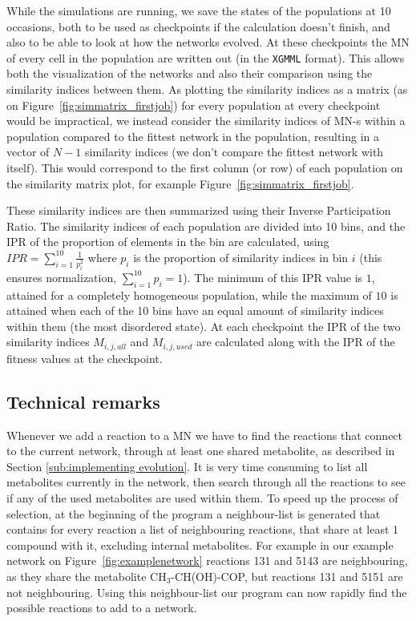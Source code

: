 \documentclass[a4paper,12pt]{article}
\begin{document}
While the simulations are running, we save the states of the populations at 10 occasions, both to be used as checkpoints if the calculation doesn't finish, and also to be able to look at how the networks evolved. At these checkpoints the MN of every cell in the population are written out (in the \texttt{XGMML} format). This allows both the visualization of the networks and also their comparison using the similarity indices between them. As plotting the similarity indices as a matrix (as on Figure~\ref{fig:simmatrix_firstjob}) for every population at every checkpoint would be impractical, we instead consider the similarity indices of MN-s within a population compared to the fittest network in the population, resulting in a vector of $N-1$ similarity indices (we don't compare the fittest network with itself). This would correspond to the first column (or row) of each population on the similarity matrix plot, for example Figure~\ref{fig:simmatrix_firstjob}.

These similarity indices are then summarized using their Inverse Participation Ratio. The similarity indices of each population are divided into 10 bins, and the IPR of the proportion of elements in the bin are calculated, using $IPR= \sum^{10}_{i=1} \frac{1}{p_i^2} $ where $p_i$ is the proportion of similarity indices in bin $i$ (this ensures normalization, $ \sum^{10}_{i=1} p_i=1$). The minimum of this IPR value is $1$, attained for a completely homogeneous population, while the maximum of $10$ is attained when each of the 10 bins have an equal amount of similarity indices within them (the most disordered state).  At each checkpoint the IPR of the two similarity indices $M_{i,j,all}$ and $M_{i,j,used}$ are calculated along with the IPR of the fitness values at the checkpoint. 




\subsection{Technical remarks}
\label{sub:technical_bits}


	Whenever we add a reaction to a MN we have to find the reactions that connect to the current network, through at least one shared metabolite, as described in Section \ref{sub:implementing evolution}. It is very time consuming to list all metabolites currently in the network, then search through all the reactions to see if any of the used metabolites are used within them. To speed up the process of selection, at the beginning of the program a neighbour-list is generated that contains for every reaction a list of neighbouring reactions, that share at least 1 compound with it, excluding internal metabolites. For example in our example network on Figure~\ref{fig:examplenetwork} reactions 131 and 5143 are neighbouring, as they share the metabolite CH$_3$-CH(OH)-COP, but reactions 131 and 5151 are not neighbouring. Using this neighbour-list our program can now rapidly find the possible reactions to add to a network. 
\end{document}
